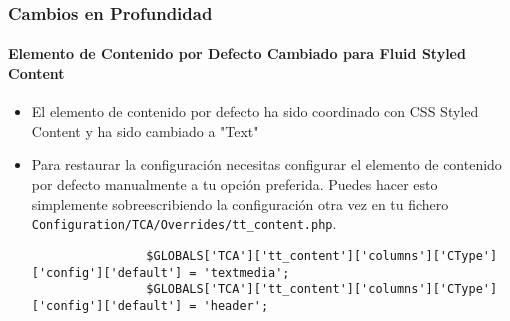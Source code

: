 
\begin{frame}[fragile]
	\frametitle{Cambios en Profundidad}
	\framesubtitle{Elemento de Contenido por Defecto Cambiado para Fluid Styled Content}

	\lstset{basicstyle=\tiny\ttfamily}

	\begin{itemize}
		\item El elemento de contenido por defecto ha sido coordinado con CSS Styled Content y ha sido cambiado a "Text"
		\item Para restaurar la configuración necesitas configurar el elemento de contenido por defecto manualmente a tu opción preferida.
			Puedes hacer esto simplemente sobreescribiendo la configuración otra vez en tu
			fichero \texttt{Configuration/TCA/Overrides/tt\_content.php}.

			\begin{lstlisting}
				$GLOBALS['TCA']['tt_content']['columns']['CType']['config']['default'] = 'textmedia';
				$GLOBALS['TCA']['tt_content']['columns']['CType']['config']['default'] = 'header';
			\end{lstlisting}

	\end{itemize}

\end{frame}


